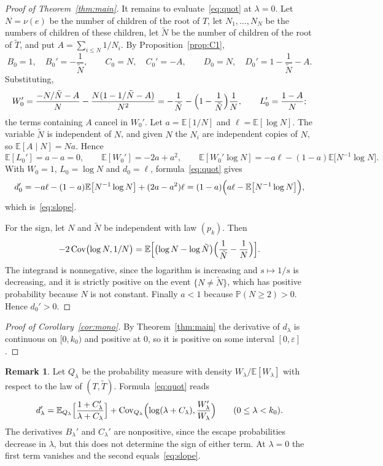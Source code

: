 \documentclass[11pt]{amsart}
\theoremstyle{definition}
\newtheorem{remark}[theorem]{Remark}
\newcommand{\Prob}{\mathbb{P}}
\newcommand{\E}{\mathbb{E}}
\newcommand{\eps}{\varepsilon}
\newcommand{\Cov}{\operatorname{Cov}}
\begin{document}
\begin{proof}[Proof of Theorem~\ref{thm:main}]
It remains to evaluate~\eqref{eq:quot} at $\lambda=0$. Let $N=\nu(e)$ be the number of children of the root of
$T$, let $N_1,\dots,N_N$ be the numbers of children of these children, let $\tilde N$ be the number of children of the
root of $\tilde T$, and put $A=\sum_{i\le N}1/N_i$. By Proposition~\ref{prop:C1},
\[
   B_0=1,\quad B_0'=-\frac1{\tilde N},\qquad C_0=N,\quad C_0'=-A,\qquad D_0=N,\quad D_0'=1-\frac1{\tilde N}-A .
\]
Substituting,
\begin{equation}\label{eq:W0}
   W_0'=\frac{-N/\tilde N-A}{N}-\frac{N(1-1/\tilde N-A)}{N^2}=-\frac1{\tilde N}-\Bigl(1-\frac1{\tilde N}\Bigr)\frac1N,\qquad
   L_0'=\frac{1-A}{N};
\end{equation}
the terms containing $A$ cancel in $W_0'$. Let $a=\E[1/N]$ and $\ell=\E[\log N]$. The variable $\tilde N$ is independent
of $N$, and given $N$ the $N_i$ are independent copies of $N$, so $\E[A\mid N]=Na$. Hence
\[
   \E[L_0']=a-a=0,\qquad \E[W_0']=-2a+a^2,\qquad
   \E[W_0'\log N]=-a\ell-(1-a)\E\bigl[N^{-1}\log N\bigr].
\]
With $W_0=1$, $L_0=\log N$ and $d_0=\ell$, formula~\eqref{eq:quot} gives
\[
   d_0'=-a\ell-(1-a)\E\bigl[N^{-1}\log N\bigr]+(2a-a^2)\ell
       =(1-a)\Bigl(a\ell-\E\bigl[N^{-1}\log N\bigr]\Bigr),
\]
which is~\eqref{eq:slope}.

For the sign, let $N$ and $\tilde N$ be independent with law $(p_k)$. Then
\[
   -2\Cov\bigl(\log N,1/N\bigr)=\E\Bigl[\bigl(\log N-\log\tilde N\bigr)\Bigl(\frac1{\tilde N}-\frac1N\Bigr)\Bigr].
\]
The integrand is nonnegative, since the logarithm is increasing and $s\mapsto1/s$ is decreasing, and it is
strictly positive on the event $\{N\ne\tilde N\}$, which has positive probability because $N$ is not constant. Finally
$a<1$ because $\Prob(N\ge2)>0$. Hence $d_0'>0$.
\end{proof}

\begin{proof}[Proof of Corollary~\ref{cor:mono}]
By Theorem~\ref{thm:main} the derivative of $d_\lambda$ is continuous on $[0,k_0)$ and positive at $0$, so it is
positive on some interval $[0,\eps]$.
\end{proof}

\begin{remark}\label{rem:Q}
Let $Q_\lambda$ be the probability measure with density $W_\lambda/\E[W_\lambda]$ with respect to the law of
$(T,\tilde T)$. Formula~\eqref{eq:quot} reads
\[
   d_\lambda'=\E_{Q_\lambda}\Bigl[\frac{1+C_\lambda'}{\lambda+C_\lambda}\Bigr]
     +\Cov_{Q_\lambda}\Bigl(\log(\lambda+C_\lambda),\frac{W_\lambda'}{W_\lambda}\Bigr)\qquad(0\le\lambda<k_0).
\]
The derivatives $B_\lambda'$ and $C_\lambda'$ are nonpositive, since the escape probabilities decrease in
$\lambda$, but this does not determine the sign of either term. At $\lambda=0$ the first term vanishes and the
second equals~\eqref{eq:slope}.
\end{remark}
\end{document}
